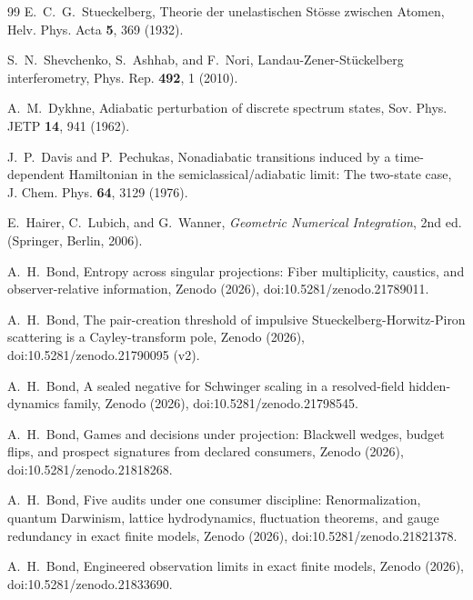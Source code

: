 \documentclass[aps,pre,reprint,nofootinbib,floatfix]{revtex4-2}
\begin{document}
\begin{thebibliography}{99}
E.~C.~G.~Stueckelberg,
Theorie der unelastischen St\"osse zwischen Atomen,
Helv. Phys. Acta \textbf{5}, 369 (1932).

S.~N.~Shevchenko, S.~Ashhab, and F.~Nori,
Landau-Zener-St\"uckelberg interferometry,
Phys. Rep. \textbf{492}, 1 (2010).

A.~M.~Dykhne,
Adiabatic perturbation of discrete spectrum states,
Sov. Phys. JETP \textbf{14}, 941 (1962).

J.~P.~Davis and P.~Pechukas,
Nonadiabatic transitions induced by a time-dependent Hamiltonian in the
semiclassical/adiabatic limit: The two-state case,
J. Chem. Phys. \textbf{64}, 3129 (1976).

E.~Hairer, C.~Lubich, and G.~Wanner,
\emph{Geometric Numerical Integration}, 2nd ed.
(Springer, Berlin, 2006).

A.~H.~Bond,
Entropy across singular projections: Fiber multiplicity, caustics, and
observer-relative information,
Zenodo (2026), doi:10.5281/zenodo.21789011.

A.~H.~Bond,
The pair-creation threshold of impulsive Stueckelberg-Horwitz-Piron
scattering is a Cayley-transform pole,
Zenodo (2026), doi:10.5281/zenodo.21790095 (v2).

A.~H.~Bond,
A sealed negative for Schwinger scaling in a resolved-field
hidden-dynamics family,
Zenodo (2026), doi:10.5281/zenodo.21798545.

A.~H.~Bond,
Games and decisions under projection: Blackwell wedges, budget flips,
and prospect signatures from declared consumers,
Zenodo (2026), doi:10.5281/zenodo.21818268.

A.~H.~Bond,
Five audits under one consumer discipline: Renormalization, quantum
Darwinism, lattice hydrodynamics, fluctuation theorems, and gauge
redundancy in exact finite models,
Zenodo (2026), doi:10.5281/zenodo.21821378.

A.~H.~Bond,
Engineered observation limits in exact finite models,
Zenodo (2026), doi:10.5281/zenodo.21833690.

\end{thebibliography}
\end{document}
